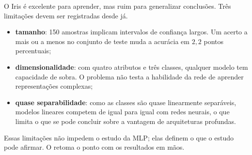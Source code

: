 O Iris é excelente para aprender, mas ruim para generalizar conclusões. Três limitações devem ser
registradas desde já.

\begin{itemize}
	\item \textbf{tamanho}: 150 amostras implicam intervalos de confiança largos. Um acerto a mais
	      ou a menos no conjunto de teste muda a acurácia em $2{,}2$ pontos percentuais;
	\item \textbf{dimensionalidade}: com quatro atributos e três classes, qualquer modelo tem
	      capacidade de sobra. O problema não testa a habilidade da rede de aprender representações
	      complexas;
	\item \textbf{quase separabilidade}: como as classes são quase linearmente separáveis, modelos
	      lineares competem de igual para igual com redes neurais, o que limita o que se pode
	      concluir sobre a vantagem de arquiteturas profundas.
\end{itemize}

Essas limitações não impedem o estudo da MLP; elas definem o que o estudo pode afirmar. O
 retoma o ponto com os resultados em mãos.
